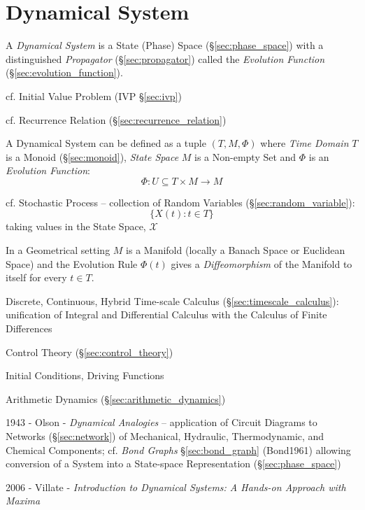 \section{Dynamical System}\label{sec:dynamical_system}

A \emph{Dynamical System} is a State (Phase) Space (\S\ref{sec:phase_space})
with a distinguished \emph{Propagator} (\S\ref{sec:propagator}) called the
\emph{Evolution Function} (\S\ref{sec:evolution_function}).

\fist cf. Initial Value Problem (IVP \S\ref{sec:ivp})

\fist cf. Recurrence Relation (\S\ref{sec:recurrence_relation})

A Dynamical System can be defined as a tuple $(T,M,\Phi)$ where \emph{Time
  Domain} $T$ is a Monoid (\S\ref{sec:monoid}), \emph{State Space} $M$ is a
Non-empty Set and $\Phi$ is an \emph{Evolution Function}:
\[
  \Phi : U \subseteq T \times M \rightarrow M
\]

\fist cf. Stochastic Process -- collection of Random Variables
(\S\ref{sec:random_variable}):
\[
  \{ X(t) : t \in T \}
\]
taking values in the State Space, $\mathcal{X}$

In a Geometrical setting $M$ is a Manifold (locally a Banach Space or Euclidean
Space) and the Evolution Rule $\Phi(t)$ gives a \emph{Diffeomorphism} of the
Manifold to itself for every $t \in T$. %

Discrete, Continuous, Hybrid \fist Time-scale Calculus
(\S\ref{sec:timescale_calculus}): unification of Integral and Differential
Calculus with the Calculus of Finite Differences

Control Theory (\S\ref{sec:control_theory})

Initial Conditions, Driving Functions


Arithmetic Dynamics (\S\ref{sec:arithmetic_dynamics})

1943 - Olson - \emph{Dynamical Analogies} -- application of Circuit Diagrams to
Networks (\S\ref{sec:network}) of Mechanical, Hydraulic, Thermodynamic, and
Chemical Components; cf. \emph{Bond Graphs} \S\ref{sec:bond_graph} (Bond1961)
allowing conversion of a System into a State-space Representation
(\S\ref{sec:phase_space})

2006 - Villate - \emph{Introduction to Dynamical Systems: A Hands-on Approach
  with Maxima}

